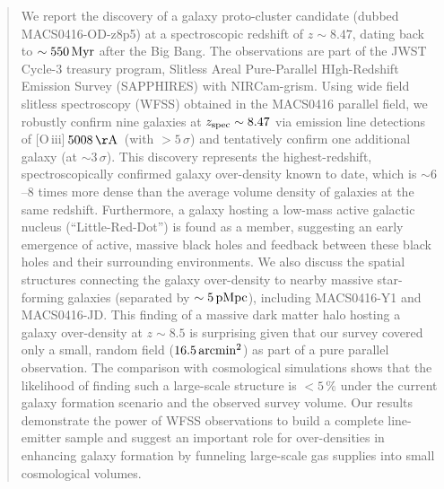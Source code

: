 \documentclass[twocolumn]{aastex631}
\def\Hb{H$\beta$}
\def\Oiii{[O\,{\sc iii}]}
\def\Oiiilong{[O\,{\sc iii}]\,$5008\,{\rm \AA}$}
\def\Hb{H$\beta$}
\begin{document}
\begin{abstract}

We report the discovery of a galaxy proto-cluster candidate (dubbed MACS0416-OD-z8p5) at a spectroscopic redshift of $z\sim8.47$, dating back to $\sim550\,{\rm Myr}$ after the Big Bang. The observations are part of the JWST Cycle-3 treasury program, Slitless Areal Pure-Parallel HIgh-Redshift Emission Survey (SAPPHIRES) with NIRCam-grism. Using wide field slitless spectroscopy (WFSS) obtained in the MACS0416 parallel field, we robustly confirm nine galaxies at $z_{\rm spec}\sim8.47$ via emission line detections of \Oiiilong\ (with $>5\,\sigma$) and tentatively confirm one additional galaxy (at $\sim3\,\sigma$).
This discovery represents the highest-redshift, spectroscopically confirmed galaxy over-density known to date, which is $\sim6$--$8$ times more dense than the average volume density of galaxies at the same redshift.
Furthermore, a galaxy hosting a low-mass active galactic nucleus (``Little-Red-Dot'') is found as a member, suggesting an early emergence of active, massive black holes and feedback between these black holes and their surrounding environments.
We also discuss the spatial structures connecting the galaxy over-density to nearby massive star-forming galaxies (separated by $\sim 5\,{\rm pM pc}$), including MACS0416-Y1 and MACS0416-JD.
This finding of a massive dark matter halo hosting a galaxy over-density at $z\sim8.5$ is surprising given that our survey covered only a small, random field ($16.5\,{\rm arcmin^2}$) as part of a pure parallel observation. 
The comparison with cosmological simulations shows that the likelihood of finding such a large-scale structure is $<5\,\%$ under the current galaxy formation scenario and the observed survey volume.
Our results demonstrate the power of WFSS observations to build a complete line-emitter sample and suggest an important role for over-densities in enhancing galaxy formation by funneling large-scale gas supplies into small cosmological volumes.
\end{abstract}
\end{document}
